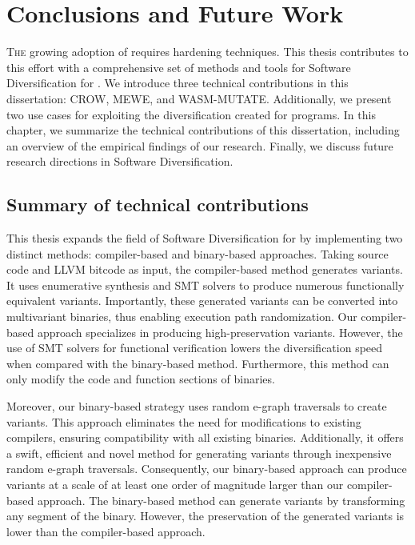 
\chapter{Conclusions and Future Work}
\label{results}


\lettrine[lines=3]{T}{he} growing adoption of \Wasm requires hardening techniques.
This thesis contributes to this effort with a comprehensive set of methods and tools for Software Diversification for \Wasm.
We introduce three technical contributions in this dissertation: CROW, MEWE, and WASM-MUTATE.
Additionally, we present two use cases for exploiting the diversification created for \Wasm programs.
In this chapter, we summarize the technical contributions of this dissertation, including an overview of the empirical findings of our research.
Finally, we discuss future research directions in \Wasm Software Diversification.

\section{Summary of technical contributions}


This thesis expands the field of Software Diversification for \Wasm by implementing two distinct methods: compiler-based and binary-based approaches. 
Taking source code and LLVM bitcode as input, the compiler-based method generates \Wasm variants.
It uses enumerative synthesis and SMT solvers to produce numerous functionally equivalent variants. 
Importantly, these generated variants can be converted into multivariant binaries, thus enabling execution path randomization. 
Our compiler-based approach specializes in producing high-preservation variants.
However, the use of SMT solvers for functional verification lowers the diversification speed when compared with the binary-based method. 
Furthermore, this method can only modify the code and function sections of \Wasm binaries.

Moreover, our binary-based strategy uses random e-graph traversals to create variants. 
This approach eliminates the need for modifications to existing compilers, ensuring compatibility with all existing \Wasm binaries. 
Additionally, it offers a swift, efficient and novel method for generating variants through inexpensive random e-graph traversals. 
Consequently, our binary-based approach can produce variants at a scale of at least one order of magnitude larger than our compiler-based approach. 
The binary-based method can generate variants by transforming any segment of the \wasm binary.
However, the preservation of the generated variants is lower than the compiler-based approach.

